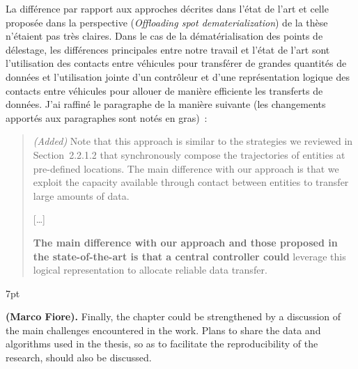 \documentclass[11pt]{article}
\newenvironment{formal}{%
  \vspace*{-5pt}
  \def\FrameCommand{%
    \hspace{-5pt}%
    {\color{gray50}\vrule width 1.25pt}%
    \colorbox{formalcolor}%
  }%
  \MakeFramed{\advance\hsize-\width\FrameRestore}%
  \noindent\hspace{-4.55pt}%
  \begin{adjustwidth}{}{7pt}%
  \normalsize
  \vspace{-2pt}
}
{%
  \vspace{2pt}\end{adjustwidth}\endMakeFramed%
  \vspace*{-10pt}
}
\begin{document}
La différence par rapport aux approches décrites dans l'état de l'art et celle proposée dans la perspective (\textit{Offloading spot dematerialization}) de la thèse n'étaient pas très claires. Dans le cas de la dématérialisation des points de délestage, les différences principales entre notre travail et l'état de l'art sont l'utilisation des contacts entre véhicules pour transférer de grandes quantités de données et l'utilisation jointe d'un contrôleur et d'une représentation logique des contacts entre véhicules pour allouer de manière efficiente les transferts de données. J'ai raffiné le paragraphe de la manière suivante (les changements apportés aux paragraphes sont notés en gras)~: 

\begin{quote}
\textit{(Added)} Note that this approach is similar to the strategies we reviewed in Section~2.2.1.2 that synchronously compose the trajectories of entities at pre-defined locations. The main difference with our approach is that we exploit the capacity available through contact between entities to transfer large amounts of data. 

\begin{center}
[\dots]
\end{center}

\textbf{The main difference with our approach and those proposed in the state-of-the-art is that a central controller could} leverage this logical representation to allocate reliable data transfer.
\end{quote}

\begin{formal}
\textbf{(Marco Fiore).} Finally, the chapter could be strengthened by a discussion of the main challenges encountered in the work. Plans to share the data and algorithms used in the thesis, so as to facilitate the reproducibility of the research, should also be discussed.
\end{formal}
\end{document}

